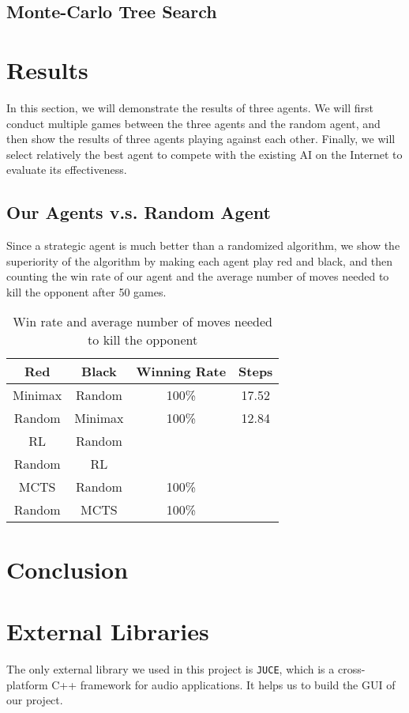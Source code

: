 \documentclass[letterpaper]{article}
\begin{document}
\subsection{Monte-Carlo Tree Search}
\label{subsec:monte-carlo-tree-search}



\section{Results}\label{sec:results}
In this section, we will demonstrate the results of three agents.
We will first conduct multiple games between the three agents and the random agent, and then show the results of three agents playing against each other.
Finally, we will select relatively the best agent to compete with the existing AI on the Internet to evaluate its effectiveness.

\subsection{Our Agents v.s. Random Agent}
\label{subsec:our-agents-vs-random-agent}
Since a strategic agent is much better than a randomized algorithm, we show the superiority of the algorithm by making each agent play red and black, and then counting the win rate of our agent and the average number of moves needed to kill the opponent after 50 games.
\begin{table}[htbp]
    \centering
    \caption{Win rate and average number of moves needed to kill the opponent}
    \label{tab1}
    \begin{tabular}{|c|c|c|c|}
        \hline
        Red & Black & Winning Rate & Steps  \\ \hline
        Minimax & Random & 100\% & 17.52 \\ \hline
        Random & Minimax & 100\% & 12.84 \\ \hline
        RL & Random &  &  \\ \hline
        Random & RL &  & \\ \hline
        MCTS & Random & 100\% & \\ \hline
        Random & MCTS & 100\% & \\ \hline
    \end{tabular}
\end{table}

\section{Conclusion}\label{sec:conclusion}


\section{External Libraries}\label{sec:acknowledgements}

The only external library we used in this project is \texttt{JUCE}, which is a cross-platform C++ framework for audio applications.
It helps us to build the GUI of our project.



\end{document}
